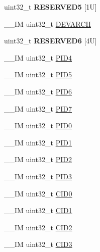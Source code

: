 \begin{DoxyCompactItemize}
\item 
\mbox{\label{struct_i_t_m___type_a14f6f27ef518e4bf31aabb8f17cf4229}} 
uint32\+\_\+t {\bfseries R\+E\+S\+E\+R\+V\+E\+D5} \mbox{[}1\+U\mbox{]}
\item 
\+\_\+\+\_\+\+IM uint32\+\_\+t \mbox{\hyperlink{struct_i_t_m___type_a2372a4ebb63e36d1eb3fcf83a74fd537}{D\+E\+V\+A\+R\+CH}}
\item 
\mbox{\label{struct_i_t_m___type_ae2fb450d0636c855ffb24185aed7f726}} 
uint32\+\_\+t {\bfseries R\+E\+S\+E\+R\+V\+E\+D6} \mbox{[}4\+U\mbox{]}
\item 
\+\_\+\+\_\+\+IM uint32\+\_\+t \mbox{\hyperlink{struct_i_t_m___type_aad5e11dd4baf6d941bd6c7450f60a158}{P\+I\+D4}}
\item 
\+\_\+\+\_\+\+IM uint32\+\_\+t \mbox{\hyperlink{struct_i_t_m___type_af9085648bf18f69b5f9d1136d45e1d37}{P\+I\+D5}}
\item 
\+\_\+\+\_\+\+IM uint32\+\_\+t \mbox{\hyperlink{struct_i_t_m___type_ad34dbe6b1072c77d36281049c8b169f6}{P\+I\+D6}}
\item 
\+\_\+\+\_\+\+IM uint32\+\_\+t \mbox{\hyperlink{struct_i_t_m___type_a2bcec6803f28f30d5baf5e20e3517d3d}{P\+I\+D7}}
\item 
\+\_\+\+\_\+\+IM uint32\+\_\+t \mbox{\hyperlink{struct_i_t_m___type_ab4a4cc97ad658e9c46cf17490daffb8a}{P\+I\+D0}}
\item 
\+\_\+\+\_\+\+IM uint32\+\_\+t \mbox{\hyperlink{struct_i_t_m___type_a89ea1d805a668d6589b22d8e678eb6a4}{P\+I\+D1}}
\item 
\+\_\+\+\_\+\+IM uint32\+\_\+t \mbox{\hyperlink{struct_i_t_m___type_a8471c4d77b7107cf580587509da69f38}{P\+I\+D2}}
\item 
\+\_\+\+\_\+\+IM uint32\+\_\+t \mbox{\hyperlink{struct_i_t_m___type_af317d5e2d946d70e6fb67c02b92cc8a3}{P\+I\+D3}}
\item 
\+\_\+\+\_\+\+IM uint32\+\_\+t \mbox{\hyperlink{struct_i_t_m___type_a30bb2b166b1723867da4a708935677ba}{C\+I\+D0}}
\item 
\+\_\+\+\_\+\+IM uint32\+\_\+t \mbox{\hyperlink{struct_i_t_m___type_ac40df2c3a6cef02f90b4e82c8204756f}{C\+I\+D1}}
\item 
\+\_\+\+\_\+\+IM uint32\+\_\+t \mbox{\hyperlink{struct_i_t_m___type_a8000b92e4e528ae7ac4cb8b8d9f6757d}{C\+I\+D2}}
\item 
\+\_\+\+\_\+\+IM uint32\+\_\+t \mbox{\hyperlink{struct_i_t_m___type_a43451f43f514108d9eaed5b017f8d921}{C\+I\+D3}}

\end{DoxyCompactItemize}
